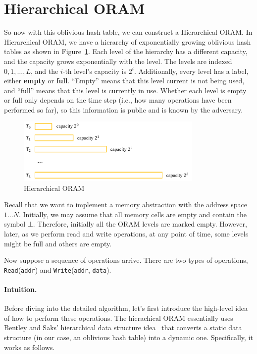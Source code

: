 \section{Hierarchical ORAM}

So now with this oblivious hash table, we can construct a Hierarchical ORAM.
In Hierarchical ORAM, we have a hierarchy of exponentially growing oblivious hash tables as shown in Figure~\ref{fig:oram}.
Each level of the hierarchy has a different capacity, and the capacity grows exponentially with the level.
The levels are indexed $0, 1, \ldots, L$, and 
the $i$-th level's capacity is $2^i$.
Additionally, every level has a label, either \textbf{empty} or \textbf{full}.
``Empty'' means that this level current is not being used,
and ``full'' means that 
this level is currently in use.
Whether each level is empty or full only
depends on the time step (i.e., how many operations
have been performed so far), so this information is public and
is known by the adversary.

\begin{figure}[!h]
  \centering
  \includegraphics[width=0.8\textwidth]{fig1.png}
  \caption{Hierarchical ORAM}
  \label{fig:oram}
\end{figure}

Recall that we want to implement 
a memory abstraction with the address space $1 \ldots N$. Initially,
we may assume that all memory cells are empty and contain the symbol $\bot$. 
Therefore, initially all the ORAM levels are marked
empty.
However, later, as we perform read and write operations, at any point of time, 
some levels might be full and others are empty.

Now suppose a sequence of operations arrive.
There are two types of operations, 
\texttt{Read}(\texttt{addr}) and \texttt{Write}(\texttt{addr}, \texttt{data}).

\paragraph{Intuition.}
Before diving into the detailed algorithm, let's first introduce the high-level idea of how to perform these operations.
The hierachical ORAM essentially uses
Bentley and Saks' hierarchical data structure idea~\cite{hierds} 
that converts
a static data structure (in our case, an oblivious hash table) 
into a dynamic one.
Specifically, it works as follows. 

